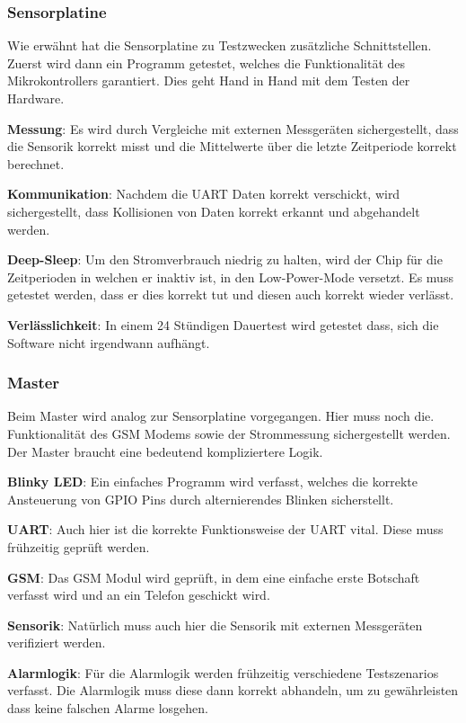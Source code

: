 \subsubsection{Sensorplatine}

Wie   erw\"ahnt   hat   die   Sensorplatine   zu   Testzwecken   zus\"atzliche
Schnittstellen. Zuerst   wird  dann   ein  Programm   getestet,  welches   die
Funktionalit\"at des  Mikrokontrollers garantiert. Dies geht Hand  in Hand mit
dem Testen der Hardware.

\textbf{Messung}: Es   wird  durch   Vergleiche  mit   externen  Messger\"aten
sichergestellt, dass die Sensorik korrekt misst und die Mittelwerte \"uber die
letzte Zeitperiode korrekt berechnet.

\textbf{Kommunikation}: Nachdem  die  UART   Daten  korrekt  verschickt,  wird
sichergestellt,  dass Kollisionen  von Daten  korrekt erkannt  und abgehandelt
werden.

\textbf{Deep-Sleep}: Um den  Stromverbrauch niedrig  zu halten, wird  der Chip
f\"ur  die Zeitperioden  in  welchen  er inaktiv  ist,  in den  Low-Power-Mode
versetzt. Es muss  getestet werden, dass er  dies korrekt tut und  diesen auch
korrekt wieder verl\"asst.

\textbf{Verl\"asslichkeit}: In  einem 24  St\"undigen Dauertest  wird getestet
dass, sich die Software nicht irgendwann aufh\"angt.

\subsubsection{Master}

Beim Master  wird analog  zur Sensorplatine  vorgegangen. Hier muss  noch die.
Funktionalit\"at des GSM Modems  sowie der Strommessung sichergestellt werden.
Der Master braucht eine bedeutend kompliziertere Logik.

\textbf{Blinky  LED}: Ein  einfaches  Programm   wird  verfasst,  welches  die
korrekte Ansteuerung von GPIO Pins durch alternierendes Blinken sicherstellt.

\textbf{UART}: Auch hier ist die korrekte Funktionsweise der UART vital. Diese
muss fr\"uhzeitig gepr\"uft werden.

\textbf{GSM}: Das  GSM  Modul  wird  gepr\"uft, in  dem  eine  einfache  erste
Botschaft verfasst wird und an ein Telefon geschickt wird.

\textbf{Sensorik}: Nat\"urlich  muss  auch  hier  die  Sensorik  mit  externen
Messger\"aten verifiziert werden.

\textbf{Alarmlogik}: F\"ur  die  Alarmlogik werden  fr\"uhzeitig  verschiedene
Testszenarios verfasst. Die  Alarmlogik muss diese dann  korrekt abhandeln, um
zu gew\"ahrleisten dass keine falschen Alarme losgehen.
